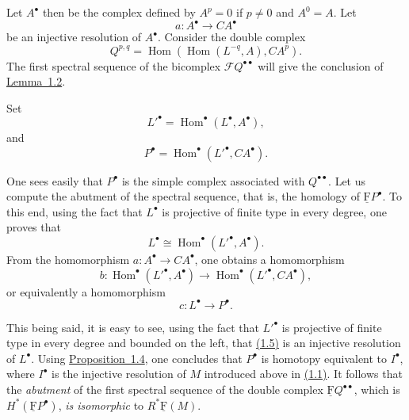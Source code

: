 \documentclass[11pt,a4paper,oneside]{book}
\providecommand{\cF}{\mathcal F}
\providecommand{\uF}{\underline{\mathrm F}}
\theoremstyle{plain}
\theoremstyle{definition}
\theoremstyle{remark}
\begin{document}

\renewcommand{\theequation}{1.\arabic{equation}}\setcounter{equation}{1}

Let $A^\bullet$ then be the complex defined by $A^p=0$ if $p\ne 0$ and
$A^0=A$. Let
\[
  a\colon A^\bullet\longrightarrow CA^\bullet
\]
be an injective resolution of $A^\bullet$. Consider the double complex
\begin{equation}\label{eq:VIII.1.2}
  Q^{p,q}=\operatorname{Hom}(\operatorname{Hom}(L^{-q},A),CA^p).
\end{equation}
The first spectral sequence of the bicomplex $\cF Q^{\bullet\bullet}$ will
give the conclusion of \hyperref[VIII.1.2]{Lemma~1.2}.

Set
\begin{equation}\label{eq:VIII.1.3}
  {L'}^\bullet=\operatorname{Hom}^\bullet(L^\bullet,A^\bullet),
\end{equation}
and
\begin{equation}\label{eq:VIII.1.4}
  P^\bullet=\operatorname{Hom}^\bullet({L'}^\bullet,CA^\bullet).
\end{equation}


\renewcommand{\theequation}{1.\arabic{equation}}\setcounter{equation}{4}

One sees easily that $P^\bullet$ is the simple complex associated with
$Q^{\bullet\bullet}$. Let us compute the abutment of the spectral sequence,
that is, the homology of $\uF P^\bullet$. To this end, using the fact that
$L^\bullet$ is projective of finite type in every degree, one proves that
\[
  L^\bullet \cong \operatorname{Hom}^\bullet({L'}^\bullet,A^\bullet).
\]
From the homomorphism $a\colon A^\bullet\to CA^\bullet$, one obtains a
homomorphism
\[
  b\colon \operatorname{Hom}^\bullet({L'}^\bullet,A^\bullet)
  \longrightarrow \operatorname{Hom}^\bullet({L'}^\bullet,CA^\bullet),
\]
or equivalently a homomorphism
\begin{equation}\label{eq:VIII.1.5}
  c\colon L^\bullet\longrightarrow P^\bullet.
\end{equation}

This being said, it is easy to see, using the fact that ${L'}^\bullet$ is
projective of finite type in every degree and bounded on the left, that
\hyperref[eq:VIII.1.5]{(1.5)} is an injective resolution of $L^\bullet$. Using \hyperref[VIII.1.4]{Proposition~1.4}, one
concludes that $P^\bullet$ is homotopy equivalent to $I^\bullet$, where
$I^\bullet$ is the injective resolution of $M$ introduced above in \hyperref[eq:VIII.1.1]{(1.1)}.
It follows that the \emph{abutment} of the first spectral sequence of the
double complex $\uF Q^{\bullet\bullet}$, which is
$H^*(\uF P^\bullet)$, \emph{is isomorphic} to $R^*\uF(M)$.
\end{document}
